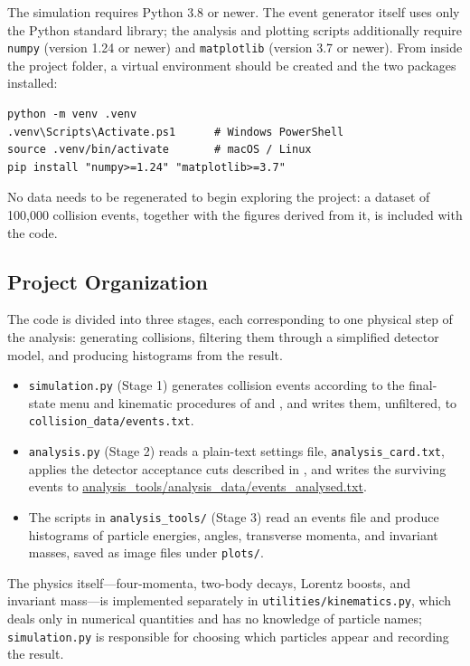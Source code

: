 \documentclass{article}
\begin{document}
The simulation requires Python 3.8 or newer. The event generator itself uses only the Python standard library; the analysis and plotting scripts additionally require \texttt{numpy} (version 1.24 or newer) and \texttt{matplotlib} (version 3.7 or newer). From inside the project folder, a virtual environment should be created and the two packages installed:
\begin{verbatim}
python -m venv .venv
.venv\Scripts\Activate.ps1      # Windows PowerShell
source .venv/bin/activate       # macOS / Linux
pip install "numpy>=1.24" "matplotlib>=3.7"
\end{verbatim}
No data needs to be regenerated to begin exploring the project: a dataset of 100{,}000 collision events, together with the figures derived from it, is included with the code.

\subsection{Project Organization}
\label{ssec:organization}
The code is divided into three stages, each corresponding to one physical step of the analysis: generating collisions, filtering them through a simplified detector model, and producing histograms from the result.
\begin{itemize}
    \item \texttt{simulation.py} (Stage 1) generates collision events according to the final-state menu and kinematic procedures of  and , and writes them, unfiltered, to \texttt{collision\_data/events.txt}.
    \item \texttt{analysis.py} (Stage 2) reads a plain-text settings file, \texttt{analysis\_card.txt}, applies the detector acceptance cuts described in , and writes the surviving events to \url{analysis_tools/analysis_data/events_analysed.txt}.
    \item The scripts in \texttt{analysis\_tools/} (Stage 3) read an events file and produce histograms of particle energies, angles, transverse momenta, and invariant masses, saved as image files under \texttt{plots/}.
\end{itemize}
The physics itself---four-momenta, two-body decays, Lorentz boosts, and invariant mass---is implemented separately in \texttt{utilities/kinematics.py}, which deals only in numerical quantities and has no knowledge of particle names; \texttt{simulation.py} is responsible for choosing which particles appear and recording the result.
\end{document}
